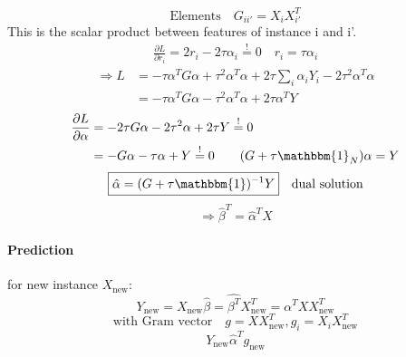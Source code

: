 \documentclass[11pt]{article}
\begin{document}
    \begin{equation*}
      \text{Elements} \quad G_{ii'}=X_iX_{i'}^T
    \end{equation*}
    This is the scalar product between features of instance i and i'.
    \begin{equation*}
      \begin{align*}
        \frac{\partial L}{\partial r_i}=2r_i-2\tau\alpha_i \overset{!}{=}0
        \quad r_i = \tau \alpha_i
      \end{align*}
    \end{equation*}
    \begin{equation*}
      \begin{align*}
        \Rightarrow L&= -\tau \alpha^T G \alpha+\tau^2\alpha^T\alpha+2\tau\sum_i\alpha_i
        Y_i-2\tau^2\alpha^T\alpha \\
        &= -\tau \alpha^T G \alpha - \tau^2 \alpha^T\alpha+2\tau\alpha^TY
      \end{align*}
    \end{equation*}
    \begin{equation*}
      \begin{align*}
        \frac{\partial L}{\partial \alpha}&=-2\tau G\alpha-2\tau^2\alpha+2\tau Y
        \overset{!}{=}0 \\
        &= -G\alpha-\tau \alpha+Y \overset{!}{=}0 \quad \quad (G+\tau\mathbbm{1}_N)\alpha=Y
      \end{align*}
    \end{equation*}
    \begin{equation}
      \boxed{\hat{\alpha}=(G+\tau \mathbbm{1})^{-1}Y} \quad \text{dual solution}
    \end{equation}
    \begin{equation*}
      \Rightarrow \hat{\beta}^T=\hat{\alpha}^TX
    \end{equation*}
    \noindent \paragraph{Prediction} for new instance $X_{\text{new}}$:
    \begin{equation*}
      Y_{\text{new}}=X_{\text{new}}\hat{\beta}=\hat{\beta^T}X_{\text{new}}^T
      =\alpha^TXX_{\text{new}}^T
    \end{equation*}
    \begin{equation*}
      \text{with Gram vector} \quad g=XX_{\text{new}}^T, g_i=X_iX_{\text{new}}^T
    \end{equation*}
    \begin{equation*}
      \boxed{Y_{\text{new}}\hat{\alpha}^Tg_{\text{new}}}
    \end{equation*}
\end{document}
